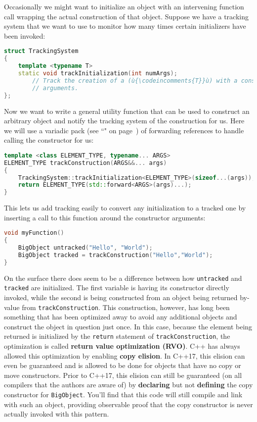 Occasionally we might want to initialize an object with an intervening
function call wrapping the actual construction of that object. Suppose
we have a tracking system that we want to use to monitor how many times
certain initializers have been invoked:

\begin{lstlisting}[language=C++]
struct TrackingSystem
{
    template <typename T>
    static void trackInitialization(int numArgs);
        // Track the creation of a (ù{\codeincomments{T}}ù) with a constructor taking (ù{\codeincomments{numArgs}}ù)
        // arguments.
};
\end{lstlisting}

\noindent Now we want to write a general utility function that can be used to
construct an arbitrary object and notify the tracking system of the
construction for us. Here we will use a variadic pack (see
``" on page~\pageref{variable-templates}) of forwarding references to handle
calling the constructor for us:

\begin{lstlisting}[language=C++]
template <class ELEMENT_TYPE, typename... ARGS>
ELEMENT_TYPE trackConstruction(ARGS&&... args)
{
    TrackingSystem::trackInitialization<ELEMENT_TYPE>(sizeof...(args));
    return ELEMENT_TYPE(std::forward<ARGS>(args)...);
}
\end{lstlisting}

\noindent This lets us add tracking easily to convert any initialization to a
tracked one by inserting a call to this function around the constructor
arguments:

\begin{lstlisting}[language=C++]
void myFunction()
{
    BigObject untracked("Hello", "World");
    BigObject tracked = trackConstruction("Hello","World");
}
\end{lstlisting}

\noindent On the surface there does seem to be a difference between how
\texttt{untracked} and \texttt{tracked} are initialized. The first
variable is having its constructor directly invoked, while the second is
being constructed from an object being returned by-value from
\texttt{trackConstruction}. This construction, however, has long been
something that has been optimized away to avoid any additional objects
and construct the object in question just once. In this case, because
the element being returned is initialized by the \texttt{return}
statement of \texttt{trackConstruction}, the optimization is called
\textbf{return value optimization (RVO)}. C++ has always
allowed this optimization by enabling \textbf{copy elision}. In C++17,
this elision can even be guaranteed and is allowed to be done for
objects that have no copy or move constructors. Prior to C++17, this
elision can still be guaranteed (on all compilers that the authors are
aware of) by \textbf{declaring} but not \textbf{defining} the copy
constructor for \texttt{BigObject}. You'll find that this code will
still compile and link with such an object, providing observable proof
that the copy constructor is never actually invoked with this pattern.

